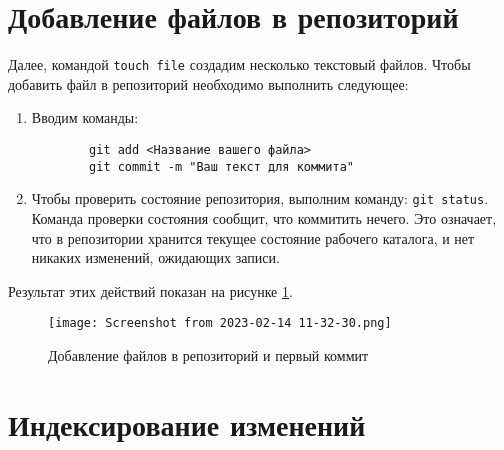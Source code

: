 \section{Добавление файлов в репозиторий}
Далее, командой \texttt{touch file} создадим несколько текстовый файлов.
Чтобы добавить файл в репозиторий необходимо выполнить следующее:
\begin{enumerate}
	\item Вводим команды:
	\begin{verbatim}
		git add <Название вашего файла>
		git commit -m "Ваш текст для коммита"
	\end{verbatim}
\item Чтобы проверить состояние репозитория,
	выполним команду: \texttt{git~status}.
	Команда проверки состояния сообщит, что коммитить нечего.
	Это означает, что в репозитории хранится текущее состояние
	рабочего каталога, и нет никаких изменений, ожидающих записи.
\end{enumerate}
Результат этих действий показан на рисунке \ref{fig:git:first_commit}.
\begin{figure}[h!tp]
	\centering
	\texttt{[image: Screenshot from 2023-02-14 11-32-30.png]}
	\caption{Добавление файлов в репозиторий и первый коммит}
	\label{fig:git:first_commit}
\end{figure}

\section{Индексирование изменений}


